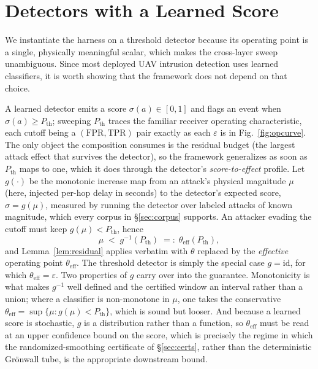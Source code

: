 \section{Detectors with a Learned Score}
\label{app:learned}
\label{sec:roc}
We instantiate the harness on a threshold detector because its operating point
is a single, physically meaningful scalar, which makes the cross-layer sweep
unambiguous. Since most deployed UAV intrusion detection uses learned
classifiers, it is worth showing that the framework does not depend on that
choice.

A learned detector emits a score $\sigma(a)\in[0,1]$ and flags an event when
$\sigma(a)\ge P_{\mathrm{th}}$; sweeping $P_{\mathrm{th}}$ traces the familiar
receiver operating characteristic, each cutoff being a
$(\mathrm{FPR},\mathrm{TPR})$ pair exactly as each $\varepsilon$ is in
Fig.~\ref{fig:opcurve}. The only object the composition consumes is the residual
budget (the largest attack effect that survives the detector), so the framework generalizes as soon as $P_{\mathrm{th}}$ maps to one, which it does through the
detector's \emph{score-to-effect} profile. Let $g(\cdot)$ be the monotonic increase map from an attack's physical magnitude $\mu$ (here,
injected per-hop delay in seconds) to the detector's expected score,
$\sigma=g(\mu)$, measured by running the detector over labeled attacks of known
magnitude, which every corpus in \S\ref{sec:corpus} supports. An attacker
evading the cutoff must keep $g(\mu)<P_{\mathrm{th}}$, hence
\begin{equation}
\label{eq:pth}
\mu \;<\; g^{-1}(P_{\mathrm{th}}) \;=:\; \theta_{\mathrm{eff}}(P_{\mathrm{th}}),
\end{equation}
and Lemma~\ref{lem:residual} applies verbatim with $\theta$ replaced by the
\emph{effective} operating point $\theta_{\mathrm{eff}}$. The threshold detector
is simply the special case $g=\mathrm{id}$, for which
$\theta_{\mathrm{eff}}=\varepsilon$. Two properties of $g$ carry over into the
guarantee. Monotonicity is what makes $g^{-1}$ well defined and the certified
window an interval rather than a union; where a classifier is non-monotone in
$\mu$, one takes the conservative
$\theta_{\mathrm{eff}}=\sup\{\mu: g(\mu)<P_{\mathrm{th}}\}$, which is sound but
looser. And because a learned score is stochastic, $g$ is a distribution rather
than a function, so $\theta_{\mathrm{eff}}$ must be read at an upper confidence
bound on the score, which is precisely the regime in which the
randomized-smoothing certificate of \S\ref{sec:certs}, rather than the
deterministic Gr\"onwall tube, is the appropriate downstream bound.

